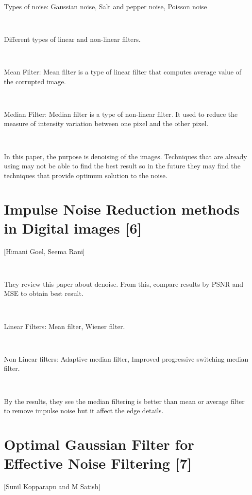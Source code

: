 \

Types of noise: Gaussian noise, Salt and pepper noise, Poisson noise

\

Different types of linear and non-linear filters.

\

Mean Filter: Mean filter is a type of linear filter that computes average value of the corrupted image.

\

Median Filter: Median filter is a type of non-linear filter. It used to reduce the measure of intensity variation between one pixel and the other pixel.

\

 In this paper, the purpose is denoising of the images. Techniques that are already using may not be able to find the best result so in the future they may find the techniques that provide optimum solution to the noise.
\vspace{1.5cm}

\section{Impulse Noise Reduction
methods in Digital images [6]}
[Himani Goel, Seema Rani]

\

They review this paper about denoise. From this, compare results by PSNR and MSE to obtain best result. 

\

Linear Filters: Mean filter, Wiener filter.

\

Non Linear filters: Adaptive median
filter, Improved progressive
switching median
filter.

\


By the results, they see the median filtering is better than mean or average filter to remove impulse noise but it affect the edge details.
\vspace{1.5cm}

\section{Optimal Gaussian Filter for Effective Noise Filtering [7]}
[Sunil Kopparapu and M Satish]
\vspace{0.5cm}

